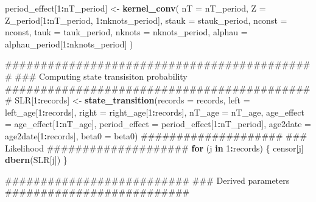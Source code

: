 \documentclass[11pt,]{article}
\newenvironment{Shaded}{\begin{snugshade}}{\end{snugshade}}
\newcommand{\KeywordTok}[1]{\textcolor[rgb]{0.13,0.29,0.53}{\textbf{#1}}}
\newcommand{\DataTypeTok}[1]{\textcolor[rgb]{0.13,0.29,0.53}{#1}}
\newcommand{\DecValTok}[1]{\textcolor[rgb]{0.00,0.00,0.81}{#1}}
\newcommand{\StringTok}[1]{\textcolor[rgb]{0.31,0.60,0.02}{#1}}
\newcommand{\ControlFlowTok}[1]{\textcolor[rgb]{0.13,0.29,0.53}{\textbf{#1}}}
\newcommand{\OperatorTok}[1]{\textcolor[rgb]{0.81,0.36,0.00}{\textbf{#1}}}
\newcommand{\NormalTok}[1]{#1}
\begin{document}
\begin{Shaded}
\begin{Highlighting}[]
\NormalTok{  period_effect[}\DecValTok{1}\OperatorTok{:}\NormalTok{nT_period] <-}\StringTok{ }\KeywordTok{kernel_conv}\NormalTok{(}
    \DataTypeTok{nT =}\NormalTok{ nT_period,}
    \DataTypeTok{Z =}\NormalTok{ Z_period[}\DecValTok{1}\OperatorTok{:}\NormalTok{nT_period, }\DecValTok{1}\OperatorTok{:}\NormalTok{nknots_period],}
    \DataTypeTok{stauk =}\NormalTok{ stauk_period,}
    \DataTypeTok{nconst =}\NormalTok{ nconst,}
    \DataTypeTok{tauk =}\NormalTok{ tauk_period,}
    \DataTypeTok{nknots =}\NormalTok{ nknots_period,}
    \DataTypeTok{alphau =}\NormalTok{ alphau_period[}\DecValTok{1}\OperatorTok{:}\NormalTok{nknots_period]}
\NormalTok{  )}
  
\NormalTok{  ############################################}
\NormalTok{  ### Computing state transisiton probability}
\NormalTok{  ############################################}
\NormalTok{  SLR[}\DecValTok{1}\OperatorTok{:}\NormalTok{records] <-}\StringTok{ }\KeywordTok{state_transition}\NormalTok{(}\DataTypeTok{records =}\NormalTok{ records,}
                                   \DataTypeTok{left =}\NormalTok{ left_age[}\DecValTok{1}\OperatorTok{:}\NormalTok{records],}
                                   \DataTypeTok{right =}\NormalTok{ right_age[}\DecValTok{1}\OperatorTok{:}\NormalTok{records],}
                                   \DataTypeTok{nT_age =}\NormalTok{ nT_age,}
                                   \DataTypeTok{age_effect =}\NormalTok{ age_effect[}\DecValTok{1}\OperatorTok{:}\NormalTok{nT_age],}
                                   \DataTypeTok{period_effect =}\NormalTok{ period_effect[}\DecValTok{1}\OperatorTok{:}\NormalTok{nT_period],}
                                   \DataTypeTok{age2date =}\NormalTok{ age2date[}\DecValTok{1}\OperatorTok{:}\NormalTok{records],}
                                   \DataTypeTok{beta0 =}\NormalTok{ beta0)}
\NormalTok{  ####################}
\NormalTok{  ### Likelihood}
\NormalTok{  ####################}
  \ControlFlowTok{for}\NormalTok{ (j }\ControlFlowTok{in} \DecValTok{1}\OperatorTok{:}\NormalTok{records) \{}
\NormalTok{    censor[j] }\OperatorTok{~}\StringTok{ }\KeywordTok{dbern}\NormalTok{(SLR[j])}
\NormalTok{  \}}

\NormalTok{  ##########################}
\NormalTok{  ### Derived parameters}
\NormalTok{  ##########################}


\end{Highlighting}
\end{Shaded}
\end{document}
